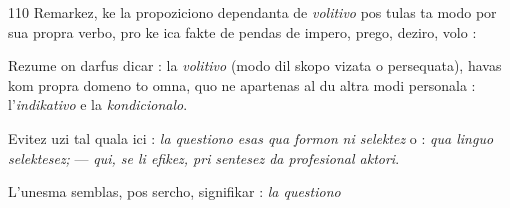 \begin{VUpage}[114]{110}
Remarkez, ke la propoziciono dependanta de \textit{volitivo} pos\cc
tulas ta modo por sua propra verbo, pro ke ica fakte de\cc
pendas de impero, prego, deziro, volo : \nl
{}\nl
{}\nl
{}

Rezume on darfus dicar : la \textit{volitivo} (modo dil skopo\nl
vizata o persequata), havas kom propra domeno to omna,\nl
quo ne apartenas al du altra modi personala : l'\textit{indikativo}\nl
e la \textit{kondicionalo}.

Evitez uzi tal quala ici : \textit{la questiono esas qua formon}\nl
\textit{ni selektez} o : \textit{qua linguo selektesez;} --- \textit{qui, se li efikez, pri}\cc
\textit{sentesez da profesional aktori}.

L'unesma semblas, pos sercho, signifikar : \textit{la questiono}\parplein
\end{VUpage}

